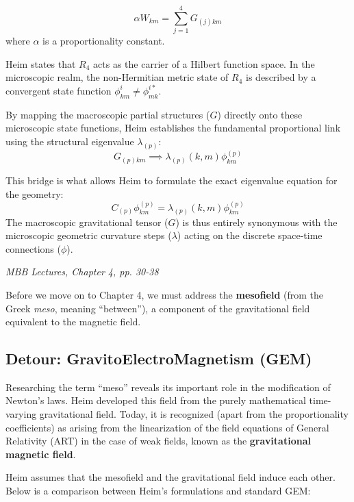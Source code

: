 \documentclass[11pt,a4paper,oneside]{article}
\begin{document}
\begin{equation}
    \alpha W_{km} = \sum_{j=1}^4 G_{(j)km}
\end{equation}
where $\alpha$ is a proportionality constant.

Heim states that $R_4$ acts as the carrier of a Hilbert function space. In the microscopic realm, the non-Hermitian metric state of $R_4$ is described by a convergent state function $\phi_{km}^i \neq \phi_{mk}^{i*}$. 

By mapping the macroscopic partial structures ($G$) directly onto these microscopic state functions, Heim establishes the fundamental proportional link using the structural eigenvalue $\lambda_{(p)}$:
\begin{equation}
    G_{(p)km} \implies \lambda_{(p)}(k,m)\phi_{km}^{(p)}
\end{equation}

This bridge is what allows Heim to formulate the exact eigenvalue equation for the geometry:
\begin{equation}
    C_{(p)}\phi_{km}^{(p)} = \lambda_{(p)}(k,m)\phi_{km}^{(p)}
\end{equation}
The macroscopic gravitational tensor ($G$) is thus entirely synonymous with the microscopic geometric curvature steps ($\lambda$) acting on the discrete space-time connections ($\phi$).

\textit{MBB Lectures, Chapter 4, pp. 30-38}

Before we move on to Chapter 4, we must address the \textbf{mesofield} (from the Greek \textit{meso}, meaning ``between''), a component of the gravitational field equivalent to the magnetic field.

\subsection{Detour: GravitoElectroMagnetism (GEM)}

Researching the term ``meso'' reveals its important role in the modification of Newton's laws. Heim developed this field from the purely mathematical time-varying gravitational field. Today, it is recognized (apart from the proportionality coefficients) as arising from the linearization of the field equations of General Relativity (ART) in the case of weak fields, known as the \textbf{gravitational magnetic field}.

Heim assumes that the mesofield and the gravitational field induce each other. Below is a comparison between Heim's formulations and standard GEM:
\end{document}

